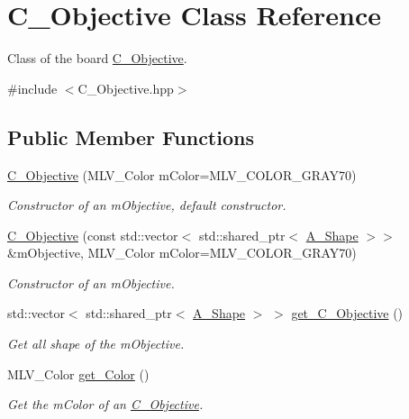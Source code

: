 \hypertarget{classObjective}{}\section{C_Objective Class Reference}
\label{classObjective}


Class of the board \hyperlink{classObjective}{C_Objective}.




{\ttfamily \#include $<$C_Objective.\+hpp$>$}

\subsection*{Public Member Functions}
\begin{DoxyCompactItemize}
\item 
\hyperlink{classObjective_ae515d38979a806a95f9476f4437311ab}{C_Objective} (M\+L\+V\+\_\+\+Color mColor=M\+L\+V\+\_\+\+C\+O\+L\+O\+R\+\_\+\+G\+R\+A\+Y70)
\begin{DoxyCompactList}\small\item\em Constructor of an mObjective, default constructor. \end{DoxyCompactList}\item
\hyperlink{classObjective_a7b72b9e9f9174ec9ee98e3a0a28773f2}{C_Objective} (const std\+::vector$<$ std\+::shared\+\_\+ptr$<$ \hyperlink{classShape}{A_Shape} $>$$>$ \&mObjective, M\+L\+V\+\_\+\+Color mColor=M\+L\+V\+\_\+\+C\+O\+L\+O\+R\+\_\+\+G\+R\+A\+Y70)
\begin{DoxyCompactList}\small\item\em Constructor of an mObjective. \end{DoxyCompactList}\item
std\+::vector$<$ std\+::shared\+\_\+ptr$<$ \hyperlink{classShape}{A_Shape} $>$ $>$ \hyperlink{classObjective_a9d379ffa32a62fbb5e5df62a88201baf}{get\+\_\+\+C_Objective} ()
\begin{DoxyCompactList}\small\item\em Get all shape of the mObjective. \end{DoxyCompactList}\item
M\+L\+V\+\_\+\+Color \hyperlink{classObjective_ae20161454cf0dd248b8e17989044eb13}{get\+\_\+\+Color} ()
\begin{DoxyCompactList}\small\item\em Get the mColor of an \hyperlink{classObjective}{C_Objective}. \end{DoxyCompactList}\end{DoxyCompactItemize}
